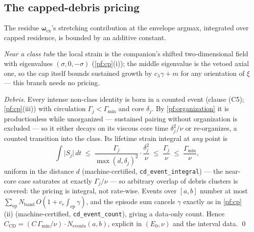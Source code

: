\documentclass[11pt,letterpaper]{amsart}
\theoremstyle{definition}
\theoremstyle{remark}
\newcommand{\vort}{\boldsymbol{\omega}}
\newcommand{\abs}[1]{\lvert #1 \rvert}
\begin{document}
\subsection{The capped-debris pricing}\label{pf:cd}
The residue $\vort_{\mathrm{cx}}$'s stretching contribution at the envelope argmax,
integrated over capped residence, is bounded by an additive constant.

\emph{Near a class tube} the local strain is the companion's shifted
two-dimensional field with eigenvalues $(\sigma,0,-\sigma)$ (\cref{pf:cp}(i)); the
middle eigenvalue is the vetoed axial one, so the cap itself bounds sustained
growth by $c_\lambda\gamma+m$ for any orientation of $\xi$ --- this branch needs no
pricing.

\emph{Debris.} Every intense non-class identity is born in a counted event (clause
(C5); \cref{pf:cp}(iii)) with circulation $\Gamma_j<\Gamma_{\min}$ and core
$\delta_j$. By \cref{pf:organization} it is productionless while unorganized ---
sustained pairing without organization is excluded --- so it either decays on its
viscous core time $\delta_j^2/\nu$ or re-organizes, a counted transition into the
class. Its lifetime strain integral at \emph{any} point is
\[
\int\abs{S_j}\,dt
\;\le\;\frac{\Gamma_j}{\max(d,\delta_j)^2}\cdot\frac{\delta_j^2}{\nu}
\;\le\;\frac{\Gamma_j}{\nu}\;\le\;\frac{\Gamma_{\min}}{\nu},
\]
uniform in the distance $d$ (machine-certified, \texttt{cd\_event\_integral})
--- the near-core case saturates at exactly
$\Gamma_j/\nu$ --- so arbitrary overlap of debris clusters is covered: the pricing
is integral, not rate-wise. Events over $[a,b]$ number at most
$\sum_{\mathrm{ep}}N_{\mathrm{band}}\,O(1+c_r\int_{\mathrm{ep}}\gamma)$, and the
episode sum cancels $\gamma$ exactly as in \cref{pf:cp}(ii)
(machine-certified, \texttt{cd\_event\_count}), giving a data-only
count. Hence
$C_{\mathrm{CD}}=(C\,\Gamma_{\min}/\nu)\cdot N_{\mathrm{events}}(a,b)$, explicit in
$(E_0,\nu)$ and the interval data. \qed
\end{document}
